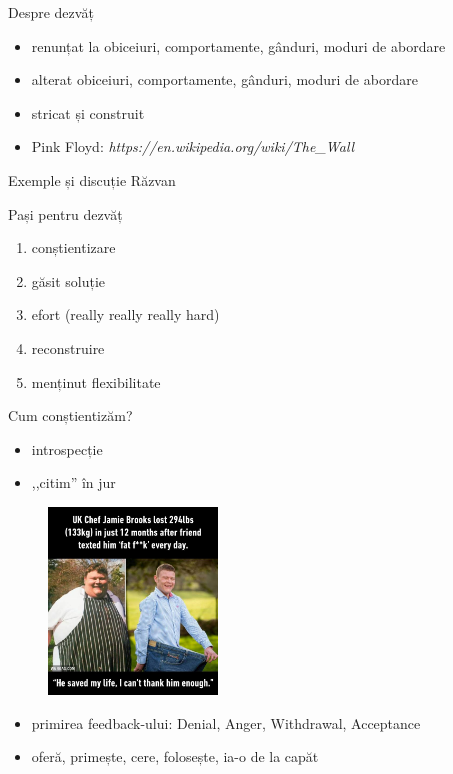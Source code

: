 \documentclass{simple}
\begin{document}
\begin{frame}{Despre dezvăț}
  \begin{itemize}
    \pause \item renunțat la obiceiuri, comportamente, gânduri, moduri de abordare
    \pause \item alterat obiceiuri, comportamente, gânduri, moduri de abordare
    \pause \item stricat și construit
    \pause \item Pink Floyd: \textit{https://en.wikipedia.org/wiki/The\_Wall}
  \end{itemize}
\end{frame}

\begin{frame}{Exemple și discuție}
  Răzvan
\end{frame}

\begin{frame}{Pași pentru dezvăț}
  \begin{enumerate}
    \pause \item conștientizare
    \pause \item găsit soluție
    \pause \item efort (really really really hard)
    \pause \item reconstruire
    \pause \item menținut flexibilitate
  \end{enumerate}
\end{frame}

\begin{frame}{Cum conștientizăm?}
  \begin{itemize}
    \pause \item introspecție
    \pause \item ,,citim'' în jur
  \end{itemize}
  \pause
  \begin{figure}
    \centering
    \includegraphics[width=0.4\textwidth]{img/getting-nasty-feedback.jpg}
  \end{figure}
  \begin{itemize}
    \pause \item primirea feedback-ului: Denial, Anger, Withdrawal, Acceptance
    \pause \item oferă, primește, cere, folosește, ia-o de la capăt
  \end{itemize}
\end{frame}
\end{document}
